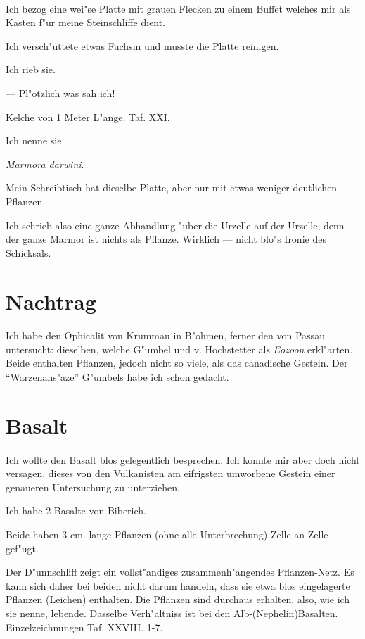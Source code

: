 \documentclass[a4paper, 11pt, oneside, german]{article}
\begin{document}
\paragraph{}
Ich bezog eine wei"se Platte mit grauen Flecken zu einem Buffet welches mir als Kasten f"ur meine Steinschliffe dient.

Ich versch"uttete etwas Fuchsin und musste die Platte reinigen.

Ich rieb sie.

--- Pl"otzlich was sah ich!

Kelche von 1 Meter L"ange. Taf. XXI.

Ich nenne sie

\emph{Marmora darwini}.

Mein Schreibtisch hat dieselbe Platte, aber nur mit etwas weniger deutlichen Pflanzen.

Ich schrieb also eine ganze Abhandlung "uber die Urzelle auf der Urzelle, denn der ganze Marmor ist nichts als Pflanze. Wirklich --- nicht blo"s Ironie des Schicksals.
\clearpage
\section{Nachtrag}
\paragraph{}
Ich habe den Ophicalit von Krummau in B"ohmen, ferner den von Passau untersucht: dieselben, welche G"umbel und v. Hochstetter als \emph{Eozoon} erkl"arten. Beide enthalten Pflanzen, jedoch nicht so viele, als das canadische Gestein. Der "`Warzenans"aze"' G"umbels habe ich schon gedacht.
\clearpage
\section{Basalt}
\paragraph{}
Ich wollte den Basalt blos gelegentlich besprechen. Ich konnte mir aber doch nicht versagen, dieses von den Vulkanisten am eifrigsten umworbene Gestein einer genaueren Untersuchung zu unterziehen.

Ich habe 2 Basalte von Biberich.

Beide haben 3 cm. lange Pflanzen (ohne alle Unterbrechung) Zelle an Zelle gef"ugt.

Der D"unnschliff zeigt ein vollst"andiges zusammenh"angendes Pflanzen-Netz. Es kann sich daher bei beiden nicht darum handeln, dass sie etwa blos eingelagerte Pflanzen (Leichen) enthalten. Die Pflanzen sind durchaus erhalten, also, wie ich sie nenne, lebende. Dasselbe Verh"altniss ist bei den Alb-(Nephelin)Basalten. Einzelzeichnungen Taf. XXVIII. 1-7.
\end{document}
